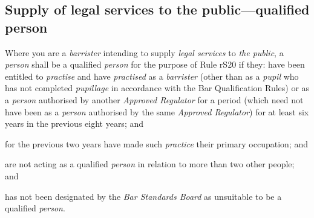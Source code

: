 \subsection{Supply of legal services to the public---qualified person}
\nl\item Where you are a \emph{barrister} intending to supply \emph{legal
services} to \emph{the public}, a \emph{person} shall be a qualified
\emph{person} for the purpose of Rule rS20 if they:
\all have been entitled to \emph{practise} and have \emph{practised} as a
\emph{barrister} (other than as a \emph{pupil} who has not completed
\emph{pupillage} in accordance with the Bar Qualification Rules) or as a
\emph{person} authorised by another \emph{Approved Regulator} for a
period (which need not have been as a \emph{person} authorised by the
same \emph{Approved Regulator}) for at least six years in the previous
eight years; and

\item for the previous two years have made such \emph{practice} their
primary occupation; and

\item are not acting as a qualified \emph{person} in relation to more than
two other people; and

\item has not been designated by the \emph{Bar Standards Board} as
unsuitable to be a qualified \emph{person}.\la


